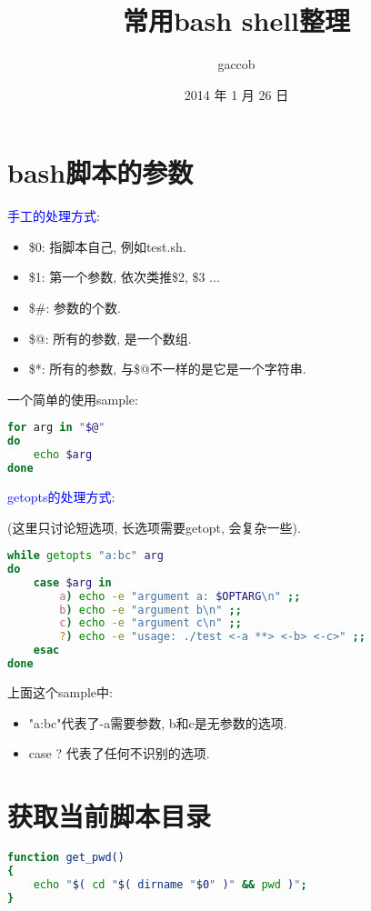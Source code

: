 
\title {\ZHH \huge 常用bash shell整理}
\author {\small gaccob}
\date {\small 2014 年 1 月 26 日}
\maketitle

\section {\ZHH bash脚本的参数} {
    { \textcolor{blue}{手工的处理方式}: } \par
    \begin{itemize}
    \item {\small \$0: 指脚本自己, 例如test.sh. }
    \item {\small \$1: 第一个参数, 依次类推\$2, \$3 ... }
    \item {\small \$\#: 参数的个数. }
    \item {\small \$@: 所有的参数, 是一个数组. }
    \item {\small \$*: 所有的参数, 与\$@不一样的是它是一个字符串. }
    \end{itemize} \par
    { 一个简单的使用sample: }\par
    \gaccobsplitinv
\begin{lstlisting}[language=bash]
for arg in "$@"
do
    echo $arg
done
\end{lstlisting}

    \gaccobsplitinv

    { \textcolor{blue}{getopts的处理方式}: }\par
    { (这里只讨论短选项, 长选项需要getopt, 会复杂一些). } \par
    \gaccobsplitinv
\begin{lstlisting}[language=bash]
while getopts "a:bc" arg
do
    case $arg in
        a) echo -e "argument a: $OPTARG\n" ;;
        b) echo -e "argument b\n" ;;
        c) echo -e "argument c\n" ;;
        ?) echo -e "usage: ./test <-a **> <-b> <-c>" ;;
    esac
done
\end{lstlisting}
    { 上面这个sample中: }\par
    \begin{itemize}
    \item {\small "a:bc"代表了-a需要参数, b和c是无参数的选项. }
    \item {\small case ? 代表了任何不识别的选项. }
    \end{itemize}
}


\section {\ZHH 获取当前脚本目录} {
\begin{lstlisting}[language=bash]
function get_pwd()
{
    echo "$( cd "$( dirname "$0" )" && pwd )";
}
\end{lstlisting}
}


